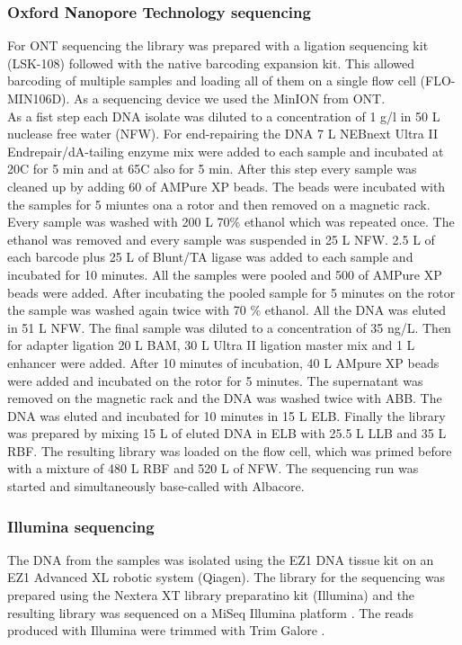 \subsubsection{Oxford Nanopore Technology sequencing}
For ONT sequencing the library was prepared with a ligation sequencing kit (LSK-108) followed with the native barcoding expansion kit. This allowed barcoding of multiple samples and loading all of them on a single flow cell (FLO-MIN106D). As a sequencing device we used the MinION from ONT. \\
As a fist step each DNA isolate was diluted to a concentration of 1 \textmu g/\textmu l in 50 \textmu L nuclease free water (NFW). For end-repairing the DNA 7 \textmu L NEBnext Ultra II Endrepair/dA-tailing enzyme mix were added to each
sample and incubated at 20\degree C for 5 min and at 65\degree C also for 5 min. After this step every sample was cleaned up by adding 60 \textmu of AMPure XP beads. The beads were incubated with the samples for 5 miuntes ona a rotor and then removed on a magnetic rack. Every sample was washed with 200 \textmu L 70\% ethanol which was repeated once. The ethanol was removed and every sample was suspended in 25 \textmu L NFW. 2.5 \textmu L of each barcode plus 25 \textmu L of Blunt/TA ligase was added to each sample and incubated for 10 minutes. All the samples were pooled and 500 \textmu of AMPure XP beads were added. After incubating the pooled sample for 5 minutes on the rotor the sample was washed again twice with 70 \% ethanol. All the DNA was eluted in 51 \textmu L NFW. The final sample was diluted to a concentration of 35 ng/\textmu L. Then for adapter ligation 20 \textmu L BAM, 30 \textmu L Ultra II ligation master mix and 1 \textmu L enhancer were added. After 10 minutes of incubation, 40 \textmu L AMpure XP beads were added and incubated on the rotor for 5 minutes. The supernatant was removed on the magnetic rack and the DNA was washed twice with ABB. The DNA was eluted and incubated for 10 minutes in 15 \textmu L ELB. Finally the library was prepared by mixing 15 \textmu L of eluted DNA in ELB with 25.5 \textmu L LLB and 35 \textmu L RBF. The resulting library was loaded on the flow cell, which was primed before with a mixture of 480 \textmu L RBF  and 520 \textmu L of NFW. The sequencing run was started and simultaneously base-called with Albacore.

\subsubsection{Illumina sequencing}
The DNA from the samples was isolated using the EZ1 DNA tissue kit on an EZ1 Advanced XL robotic system (Qiagen). The library for the sequencing was prepared using the Nextera XT library preparatino kit (Illumina) and the resulting library was sequenced on a MiSeq Illumina platform \cite{nanopore}. The reads produced with Illumina were trimmed with Trim Galore \cite{noauthor_babraham_nodate}.

